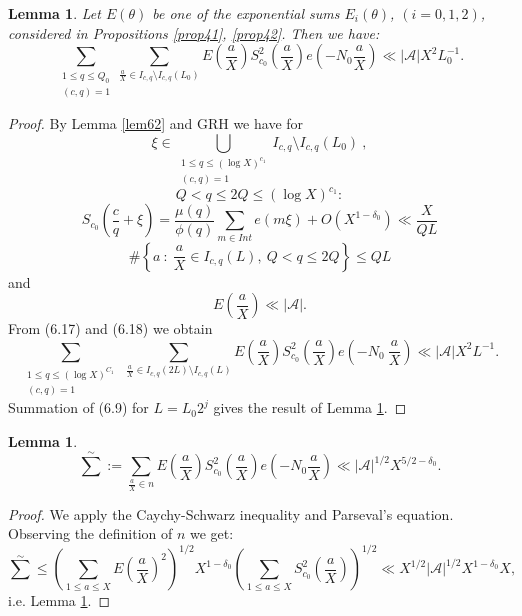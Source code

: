 \documentclass{amsart}
\newtheorem{lemma}[theorem]{Lemma}
\numberwithin{equation}{subsection}
\begin{document}
\begin{lemma}\label{lem619}
Let $E(\theta)$ be one of the exponential sums $E_i(\theta)$, $(i=0,1,2)$, considered in Propositions \ref{prop41}, \ref{prop42}. Then we have:
\[
\sum_{\substack{1\leq q\leq Q_0 \\ (c, q)=1}}\sum_{\frac{a}{X}\in I_{c,q}\setminus I_{c,q}(L_0)} E\left(\frac{a}{X}\right) S_{c_0}^2\left(\frac{a}{X}\right) e\left(-N_0\frac{a}{X}\right) \ll |\mathcal{A}| X^2 L_0^{-1}.  \tag{6.16}
\]
\end{lemma}
\begin{proof}
By Lemma \ref{lem62} and GRH we have for 
$$\xi\in \bigcup_{\substack{1\leq q \leq (\log X)^{c_1} \\ (c,q)=1}} I_{c,q} \setminus I_{c,q} (L_0)\:,$$
$$Q<q\leq 2Q\leq (\log X)^{c_1}:$$
\[
S_{c_0}\left(\frac{c}{q}+\xi\right)=\frac{\mu(q)}{\phi(q)}\sum_{m\in Int} e(m\xi)+O(X^{1-\delta_0}) \ll \frac{X}{QL}  \tag{6.17}
\]
\[
\#\left\{a\::\: \frac{a}{X}\in I_{c,q}(L),\ Q<q\leq 2Q\right\}\leq QL  \tag{6.18}
\]
and
$$E\left(\frac{a}{X}\right)\ll |\mathcal{A}|.$$
From (6.17) and (6.18) we obtain 
\[ 
\sum_{\substack{1\leq q \leq (\log X)^{C_1} \\ (c,q)=1}} \ \sum_{\frac{a}{X}\in I_{c,q}(2L) \setminus I_{c,q}(L)} E\left(\frac{a}{X}\right)S_{c_0}^2 \left(\frac{a}{X}\right) e\left(-N_0\:\frac{a}{X}\right) \ll |\mathcal{A}| X^2 L^{-1}. \tag{6.19}
\]
Summation of (6.9) for $L=L_0 2^j$ gives the result of Lemma \ref{lem619}.
\end{proof}

\begin{lemma}\label{lem620}
$$\sum^{\sim}:=\sum_{\frac{a}{X}\in n} E\left(\frac{a}{X}\right) S_{c_0}^2 \left(\frac{a}{X}\right) e\left(-N_0\frac{a}{X}\right) \ll |\mathcal{A}|^{1/2} X^{5/2-\delta_0}.$$
\end{lemma}
\begin{proof}
We apply the Caychy-Schwarz inequality and Parseval's equation. Observing the definition of $n$ we get:
$$\sum^{\sim} \leq \left( \sum_{1\leq a\leq X} E \left(\frac{a}{X}\right)^2 \right)^{1/2} X^{1-\delta_0} \left(\sum_{1\leq a\leq X} S_{c_0}^2  \left(\frac{a}{X}\right)\right)^{1/2} \ll X^{1/2} |\mathcal{A}|^{1/2} X^{1-\delta_0} X,$$
i.e. Lemma \ref{lem620}.
\end{proof}
\end{document}
